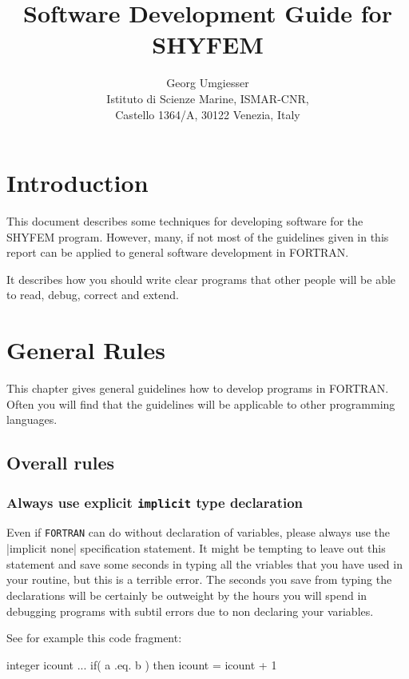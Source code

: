 \documentclass[a4paper]{report}
\title{%
	Software Development Guide for SHYFEM
}
\author{%
Georg Umgiesser
\\Istituto di Scienze Marine, ISMAR-CNR,
\\Castello 1364/A, 30122 Venezia, Italy
}
\newcommand{\FFF}{{\tt FORTRAN}}
\begin{document}

\chapter{Introduction}

This document describes some techniques for developing
software for the SHYFEM program. However, many, if not most of the
guidelines given in this report can be applied to general 
software development in FORTRAN. 

It describes how you should write clear programs that other people will
be able to read, debug, correct and extend. 

\chapter{General Rules}

This chapter gives general guidelines how to develop programs in
FORTRAN. Often you will find that the guidelines will be applicable 
to other programming languages.


\section{Overall rules}

\subsection{Always use explicit {\tt implicit} type declaration}

Even if \FFF{} can do without declaration of variables, please always
use the |implicit none| specification statement. It might be tempting to
leave out this statement and save some seconds in typing all the vriables that
you have used in your routine, but this is a terrible error. The seconds
you save from typing the declarations will be certainly be outweight by
the hours you will spend in debugging programs with subtil errors due
to non declaring your variables.

See for example this code fragment:

\begin{code}
	integer icount
	...
	if( a .eq. b ) then icount = icount + 1
\end{code}
\end{document}
